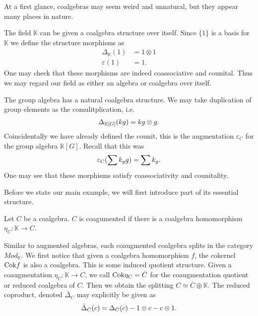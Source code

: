 \documentclass[../thesis.tex]{subfiles}
\begin{document}
            At a first glance, coalgebras may seem weird and unnatural, but they appear many places in nature.

            \begin{example}
                The field $\mathbb{K}$ can be given a coalgebra structure over itself. Since $\{1\}$ is a basis for $\mathbb{K}$ we define the structure morphisms as
                \begin{align*}
                    \Delta_{\mathbb{K}}(1) & = 1\otimes 1 \\
                    \varepsilon(1) & = 1.
                \end{align*}
                One may check that these morphisms are indeed coassociative and counital. Thus we may regard our field as either an algebra or coalgebra over itself.
            \end{example}

            \begin{example}
                The group algebra has a natural coalgebra structure. We may take duplication of group elements as the comulitplication, i.e.
                \begin{align*}
                    \Delta_{\mathbb{K}[G]}(kg) = kg\otimes g\tt{.}
                \end{align*}
                Coincidentally we have already defined the counit, this is the augmentation $\varepsilon_C$ for the group algebra $\mathbb{K}[G]$. Recall that this was
                \begin{align*}
                    \varepsilon_C(\sum k_gg) = \sum k_g\tt{.}
                \end{align*}
                One may see that these morphisms satisfy coassociativity and counitality.
            \end{example}

            Before we state our main example, we will first introduce part of its essential structure.

            \begin{definition}
                Let $C$ be a coalgebra. $C$ is coagumented if there is a coalgebra homomorphism $\eta_C:\mathbb{K}\rightarrow C$.
            \end{definition}

            Similar to augmented algebras, each coaugmented coalgebra splits in the category $Mod_\mathbb{K}$. We first notice that given a coalgebra homomorphism $f$, the cokernel $\tt{Cok}f$ is also a coalgebra. This is some induced quotient structure. Given a coaugmentation $\eta_C : \mathbb{K} \rightarrow C$, we call $\tt{Cok}\eta_C = \bar{C}$ for the coaugmentation quotient or reduced coalgebra of $C$. Then we obtain the splitting $C \simeq \bar{C}\oplus\mathbb{K}$. The reduced coproduct, denoted $\bar{\Delta}_C$ may explicitly be given as
            \begin{align*}
                \bar{\Delta}_C(c) = \Delta_C(c) - 1\otimes c - c\otimes 1\tt{.}
            \end{align*}
\end{document}
